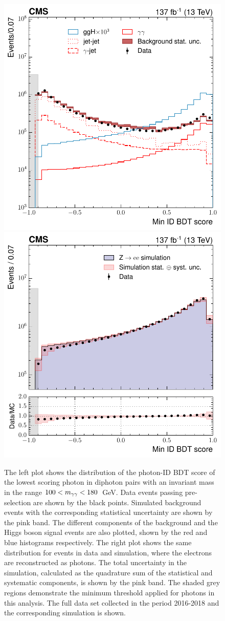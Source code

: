 \begin{figure}
  \centering
  \includegraphics[width=.49\textwidth]{Figures/hgg_overview/DiphoBDT_minIDMVA_logPlot.pdf}
  \includegraphics[width=.49\textwidth]{Figures/hgg_overview/DYValidation_DiphoBDT_RatioPlot_minIDMVA_logPlot.pdf}
  \caption[Photon ID output score distributions]
  {
    The left plot shows the distribution of the photon-ID BDT score of the lowest scoring photon in diphoton pairs with an invariant mass in the range ${100<m_{\gamma\gamma}<180}$~GeV. Data events passing pre-selection are shown by the black points. Simulated background events with the corresponding statistical uncertainty are shown by the pink band. The different components of the background and the Higgs boson signal events are also plotted, shown by the red and blue histograms respectively. The right plot shows the same distribution for \Zee events in data and simulation, where the electrons are reconstructed as photons. The total uncertainty in the simulation, calculated as the quadrature sum of the statistical and systematic components, is shown by the pink band. The shaded grey regions demonstrate the minimum threshold applied for photons in this analysis. The full data set collected in the period 2016-2018 and the corresponding simulation is shown.
  }
  \label{fig:photon_id_1}
\end{figure}

